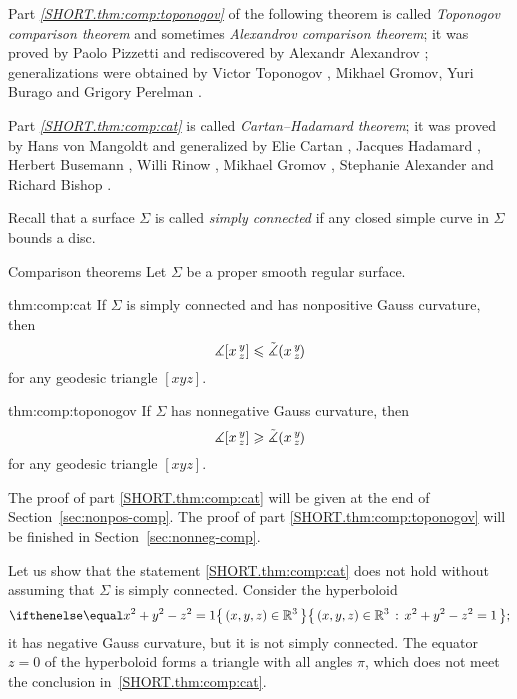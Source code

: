 Part \textit{\ref{SHORT.thm:comp:toponogov}} of the following theorem is called \emph{Toponogov comparison theorem} and sometimes \emph{Alexandrov comparison theorem};
it was proved by Paolo Pizzetti \cite{pizzetti} and rediscovered by Alexandr Alexandrov \cite{alexandrov}; 
generalizations were obtained by  Victor Toponogov \cite{toponogov1957}, Mikhael Gromov, Yuri Burago and Grigory Perelman \cite{burago-gromov-perelman}.

Part \textit{\ref{SHORT.thm:comp:cat}} is called \emph{Cartan--Hadamard theorem};
it was proved by 
Hans von Mangoldt \cite{mangoldt} and generalized by Elie Cartan \cite{cartan}, Jacques Hadamard \cite{hadamard},
Herbert Busemann \cite{busemann},
Willi Rinow \cite{rinow},
Mikhael Gromov \cite[p.~119]{gromov-1987},
Stephanie Alexander and Richard Bishop \cite{alexander-bishop1990}.

Recall that a surface $\Sigma$ is called {}\emph{simply connected} if any closed simple curve in $\Sigma$ bounds a disc.

\begin{thm}{Comparison theorems}\label{thm:comp}
Let $\Sigma$ be a proper smooth regular surface.

\begin{subthm}{thm:comp:cat}
If $\Sigma$ is simply connected and has nonpositive Gauss curvature,
 then 
\[\measuredangle[x\,{}^{y}_{z}]\leqslant\tilde\measuredangle(x\,{}^{y}_{z}\hspace{-0.2ex})\]
for any geodesic triangle $[xyz]$.
\end{subthm}

\begin{subthm}{thm:comp:toponogov}
If $\Sigma$ has nonnegative Gauss curvature, then 
 \[\measuredangle[x\,{}^{y}_{z}]\geqslant\tilde\measuredangle(x\,{}^{y}_{z}\hspace{-0.2ex})\]
for any geodesic triangle $[xyz]$.
\end{subthm}

\end{thm}

The proof of part \ref{SHORT.thm:comp:cat} will be given at the end of Section~\ref{sec:nonpos-comp}.
The proof of part \ref{SHORT.thm:comp:toponogov} will be finished in  Section~\ref{sec:nonneg-comp}.

Let us show that the statement \ref{SHORT.thm:comp:cat} does not hold without assuming that $\Sigma$ is simply connected.
Consider the hyperboloid
\[\set{(x,y,z)\in\RR^3}{x^2+y^2-z^2=1};\]
it has negative Gauss curvature, but it is not simply connected.
The equator $z=0$ of the hyperboloid
forms a triangle with all angles $\pi$, which does not meet the conclusion in~\ref{SHORT.thm:comp:cat}.

